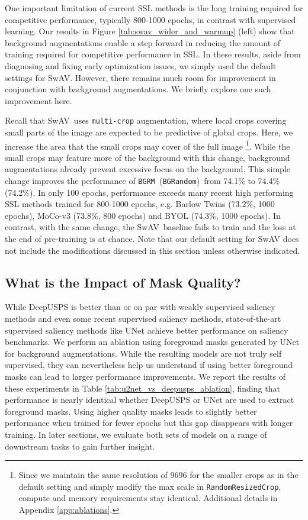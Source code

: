 \documentclass[twoside,11pt]{article}
\newcommand{\bgrm}{\texttt{BG\textunderscore RM}}
\newcommand{\bgrand}{\texttt{BG\textunderscore Random}}
\newcommand{\swav}{SwAV}
\begin{document}
One important limitation of current SSL methods is the long training required for competitive performance, typically 800-1000 epochs, in contrast with supervised learning. Our results in Figure \ref{tab:swav_wider_and_warmup} (left) show that background augmentations enable a step forward in reducing the amount of training required for competitive performance in SSL. In these results, aside from diagnosing and fixing early optimization issues, we simply used the default settings for \swav. However, there remains much room for improvement in conjunction with background augmentations. We briefly explore one such improvement here.

Recall that \swav~uses \texttt{multi-crop} augmentation, where local crops covering small parts of the image are expected to be predictive of global crops. Here, we increase the area that the small crops may cover of the full image \footnote{Since we maintain the same resolution of 9696 for the smaller crops as in the default setting and simply modify the max scale in \texttt{RandomResizedCrop}, compute and memory requirements stay identical. Additional details in Appendix \ref{app:ablations}.}. While the small crops may feature more of the background with this change, background augmentations already prevent excessive focus on the background. This simple change improves the performance of \bgrm~(\bgrand)~from 74.1\% to 74.4\% (74.2\%). In only 100 epochs, performance exceeds many recent high performing SSL methods trained for 800-1000 epochs, e.g. Barlow Twins (73.2\%, 1000 epochs), MoCo-v3 \citep{chen_empirical_2021} (73.8\%, 800 epochs) and BYOL (74.3\%, 1000 epochs). In contrast, with the same change, the \swav~baseline fails to train and the loss at the end of pre-training is at chance. Note that our default setting for SwAV does not include the modifications discussed in this section unless otherwise indicated.




\subsection{What is the Impact of Mask Quality?}
\label{sec:u2net_mask_imnet_lin_eval}

While DeepUSPS is better than or on par with weakly supervised saliency methods and even some recent supervised saliency methods, state-of-the-art supervised saliency methods like UNet achieve better performance on saliency benchmarks. We perform an ablation using foreground masks generated by UNet for background augmentations. While the resulting models are not truly self supervised, they can nevertheless help us understand if using better foreground masks can lead to larger performance improvements. We report the results of these experiments in Table \ref{tab:u2net_vs_deepusps_ablation}, finding that performance is nearly identical whether DeepUSPS or UNet are used to extract foreground masks. Using higher quality masks leads to slightly better performance when trained for fewer epochs but this gap disappears with longer training. In later sections, we evaluate both sets of models on a range of downstream tasks to gain further insight. 
\end{document}
